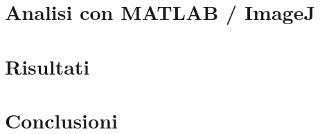\documentclass[a4paper, 11pt, italian, oneside]{book}
\begin{document}
\chapter{Analisi con MATLAB / ImageJ}
\chapter{Risultati}
\chapter{Conclusioni}


\backmatter
\printglossary[title=Glossario, toctitle=Glossario]
\printglossary[type=\acronymtype]
\clearpage
{}

\end{document}

